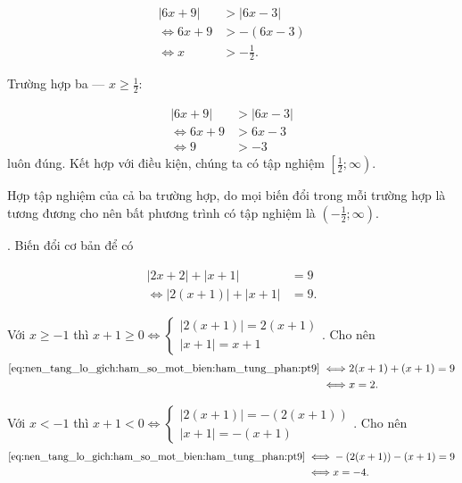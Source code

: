 \begin{align*}
   |6x + 9| &> |6x - 3| \\
   \iff 6x + 9 &> -(6x - 3) \\
   \iff x &> -\frac{1}{2}.
\end{align*}

\textcolor{colorEmphasisGreen}{Trường hợp ba --- $x \geq \frac{1}{2}$}:

\begin{align*}
   |6x + 9| &> |6x - 3| \\
   \iff 6x + 9 &> 6x - 3 \\
   \iff 9 &> -3
\end{align*}
luôn đúng. Kết hợp với điều kiện, chúng ta có tập nghiệm $\left[\frac{1}{2}; \infty\right)$.

Hợp tập nghiệm của cả ba trường hợp, do mọi biến đổi trong mỗi trường hợp là tương đương cho nên bất phương trình có tập nghiệm là $\left(-\frac{1}{2}; \infty\right)$.

. Biến đổi cơ bản để có

\begin{align}
   \left|2x + 2\right| + \left|x + 1\right| &= 9 \nonumber\\
   \iff \left|2(x + 1)\right| + \left|x + 1\right| &= 9. \label{eq:nen_tang_lo_gich:ham_so_mot_bien:ham_tung_phan:pt9}
\end{align}

Với \textcolor{colorEmphasisCyan}{$x \geq -1$} thì $x+ 1 \geq 0 \iff \begin{cases}
   \left|2(x + 1)\right| = 2(x + 1) \\
   \left|x + 1\right| = x + 1
\end{cases}$. Cho nên 
\begin{align*}
   \text{\eqref{eq:nen_tang_lo_gich:ham_so_mot_bien:ham_tung_phan:pt9}} \iff &2(x + 1) + (x + 1) = 9 \\
   \iff &x = 2.
\end{align*}

Với \textcolor{colorEmphasis}{$x < -1$} thì $x + 1 < 0 \iff \begin{cases}
   \left|2(x + 1)\right| = -\left(2(x + 1)\right) \\
   \left|x + 1\right| = -\left(x + 1\right)
\end{cases}$. Cho nên
\begin{align*}
   \text{\eqref{eq:nen_tang_lo_gich:ham_so_mot_bien:ham_tung_phan:pt9}} \iff &-\left(2(x + 1)\right) -\left(x + 1\right) = 9 \\
   \iff &x = -4.
\end{align*}

